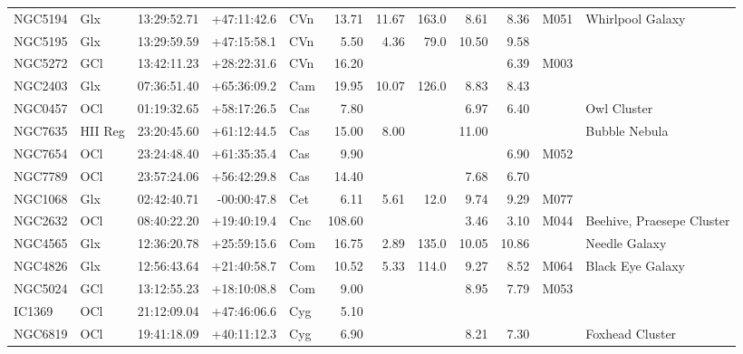 \documentclass[11pt]{article}
\begin{document}
\begin{longtable}{llrrlrrrrrrl}
  NGC5194 & Glx     & 13:29:52.71 & +47:11:42.6 & CVn   & 13.71  & 11.67  & 163.0 & 8.61  & 8.36  & M051    & Whirlpool Galaxy               \\
  NGC5195 & Glx     & 13:29:59.59 & +47:15:58.1 & CVn   & 5.50   & 4.36   & 79.0  & 10.50 & 9.58  &         &                                \\
  NGC5272 & GCl     & 13:42:11.23 & +28:22:31.6 & CVn   & 16.20  &        &       &       & 6.39  & M003    &                                \\
  NGC2403 & Glx     & 07:36:51.40 & +65:36:09.2 & Cam   & 19.95  & 10.07  & 126.0 & 8.83  & 8.43  &         &                                \\
  NGC0457 & OCl     & 01:19:32.65 & +58:17:26.5 & Cas   & 7.80   &        &       & 6.97  & 6.40  &         & Owl Cluster                    \\
  NGC7635 & HII Reg & 23:20:45.60 & +61:12:44.5 & Cas   & 15.00  & 8.00   &       & 11.00 &       &         & Bubble Nebula                  \\
  NGC7654 & OCl     & 23:24:48.40 & +61:35:35.4 & Cas   & 9.90   &        &       &       & 6.90  & M052    &                                \\
  NGC7789 & OCl     & 23:57:24.06 & +56:42:29.8 & Cas   & 14.40  &        &       & 7.68  & 6.70  &         &                                \\
  NGC1068 & Glx     & 02:42:40.71 & -00:00:47.8 & Cet   & 6.11   & 5.61   & 12.0  & 9.74  & 9.29  & M077    &                                \\
  NGC2632 & OCl     & 08:40:22.20 & +19:40:19.4 & Cnc   & 108.60 &        &       & 3.46  & 3.10  & M044    & Beehive, Praesepe Cluster      \\
  NGC4565 & Glx     & 12:36:20.78 & +25:59:15.6 & Com   & 16.75  & 2.89   & 135.0 & 10.05 & 10.86 &         & Needle Galaxy                  \\
  NGC4826 & Glx     & 12:56:43.64 & +21:40:58.7 & Com   & 10.52  & 5.33   & 114.0 & 9.27  & 8.52  & M064    & Black Eye Galaxy               \\
  NGC5024 & GCl     & 13:12:55.23 & +18:10:08.8 & Com   & 9.00   &        &       & 8.95  & 7.79  & M053    &                                \\
  IC1369  & OCl     & 21:12:09.04 & +47:46:06.6 & Cyg   & 5.10   &        &       &       &       &         &                                \\
  NGC6819 & OCl     & 19:41:18.09 & +40:11:12.3 & Cyg   & 6.90   &        &       & 8.21  & 7.30  &         & Foxhead Cluster                \\

\end{longtable}
\end{document}
